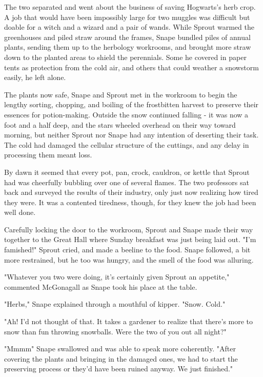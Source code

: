 The two separated and went about the business of saving Hogwarts's herb crop. A job that would have been impossibly large for two muggles was difficult but doable for a witch and a wizard and a pair of wands. While Sprout warmed the greenhouses and piled straw around the frames, Snape bundled piles of annual plants, sending them up to the herbology workrooms, and brought more straw down to the planted areas to shield the perennials. Some he covered in paper tents as protection from the cold air, and others that could weather a snowstorm easily, he left alone.

The plants now safe, Snape and Sprout met in the workroom to begin the lengthy sorting, chopping, and boiling of the frostbitten harvest to preserve their essences for potion-making. Outside the snow continued falling - it was now a foot and a half deep, and the stars wheeled overhead on their way toward morning, but neither Sprout nor Snape had any intention of deserting their task. The cold had damaged the cellular structure of the cuttings, and any delay in processing them meant loss.

By dawn it seemed that every pot, pan, crock, cauldron, or kettle that Sprout had was cheerfully bubbling over one of several flames. The two professors sat back and surveyed the results of their industry, only just now realizing how tired they were. It was a contented tiredness, though, for they knew the job had been well done.

Carefully locking the door to the workroom, Sprout and Snape made their way together to the Great Hall where Sunday breakfast was just being laid out. "I'm famished!" Sprout cried, and made a beeline to the food. Snape followed, a bit more restrained, but he too was hungry, and the smell of the food was alluring.

"Whatever you two were doing, it's certainly given Sprout an appetite," commented McGonagall as Snape took his place at the table.

"Herbs," Snape explained through a mouthful of kipper. "Snow. Cold."

"Ah! I'd not thought of that. It takes a gardener to realize that there's more to snow than fun throwing snowballs. Were the two of you out all night?"

"Mmmm{\el}" Snape swallowed and was able to speak more coherently. "After covering the plants and bringing in the damaged ones, we had to start the preserving process or they'd have been ruined anyway. We just finished."

